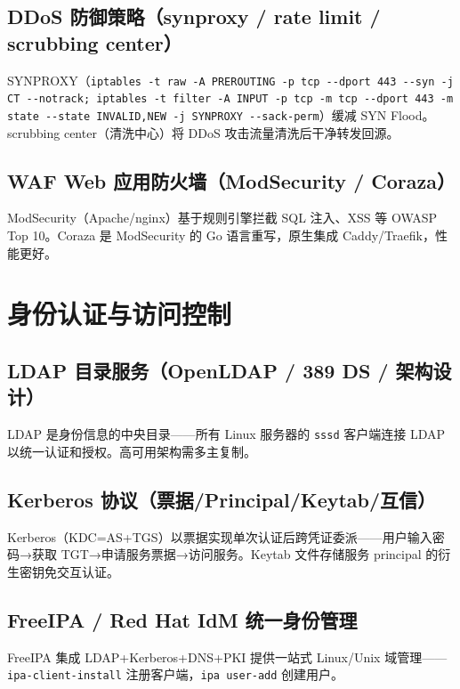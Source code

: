 \documentclass[12pt,UTF8]{ctexbook}
\begin{document}
  \section{DDoS 防御策略（synproxy / rate limit / scrubbing center）}

SYNPROXY（\verb|iptables -t raw -A PREROUTING -p tcp --dport 443 --syn -j CT --notrack; iptables -t filter -A INPUT -p tcp -m tcp --dport 443 -m state --state INVALID,NEW -j SYNPROXY --sack-perm|）缓减 SYN Flood。scrubbing center（清洗中心）将 DDoS 攻击流量清洗后干净转发回源。

  \section{WAF Web 应用防火墙（ModSecurity / Coraza）}

ModSecurity（Apache/nginx）基于规则引擎拦截 SQL 注入、XSS 等 OWASP Top 10。Coraza 是 ModSecurity 的 Go 语言重写，原生集成 Caddy/Traefik，性能更好。


\chapter{身份认证与访问控制}
\label{chap:auth-access}

  \section{LDAP 目录服务（OpenLDAP / 389 DS / 架构设计）}

LDAP 是身份信息的中央目录——所有 Linux 服务器的 \verb|sssd| 客户端连接 LDAP 以统一认证和授权。高可用架构需多主复制。

  \section{Kerberos 协议（票据/Principal/Keytab/互信）}

Kerberos（KDC=AS+TGS）以票据实现单次认证后跨凭证委派——用户输入密码→获取 TGT→申请服务票据→访问服务。Keytab 文件存储服务 principal 的衍生密钥免交互认证。

  \section{FreeIPA / Red Hat IdM 统一身份管理}

FreeIPA 集成 LDAP+Kerberos+DNS+PKI 提供一站式 Linux/Unix 域管理——\verb|ipa-client-install| 注册客户端，\verb|ipa user-add| 创建用户。
\end{document}

